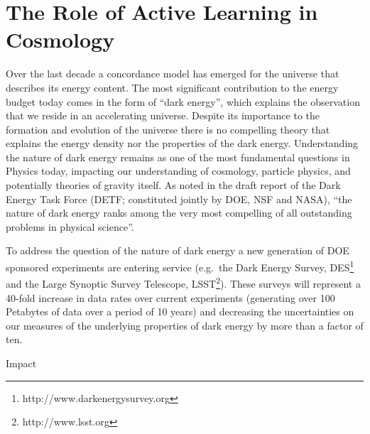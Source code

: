 \documentclass[useAMS,usenatbib,tightenlines,11pt,preprint]{aastex}
\begin{document}



\section{The Role of Active Learning in Cosmology}

Over the last decade a concordance model has emerged for the universe
that describes its energy content. The most significant contribution
to the energy budget today comes in the form of ``dark energy'', which
explains the observation that we reside in an accelerating
universe. Despite its importance to the formation and evolution of the
universe there is no compelling theory that explains the energy
density nor the properties of the dark energy. Understanding the
nature of dark energy remains as one of the most fundamental questions
in Physics today, impacting our understanding of cosmology, particle
physics, and potentially theories of gravity itself.  As noted in the draft
report of the Dark Energy Task Force (DETF; constituted jointly by
DOE, NSF and NASA), ``the nature of dark energy ranks among the very
most compelling of all outstanding problems in physical science''.


To address the question of the nature of dark energy a new generation
of DOE sponsored experiments are entering service (e.g.\ the Dark
Energy Survey, DES\footnote{http://www.darkenergysurvey.org} and the
Large Synoptic Survey Telescope, LSST\footnote{http://www.lsst.org}).  These
surveys will represent a 40-fold increase in data rates over current
experiments (generating over 100 Petabytes of data over a period of 10
years) and decreasing the uncertainties on our measures of the
underlying properties of dark energy by more than a factor of ten.

Impact 
\end{document}
